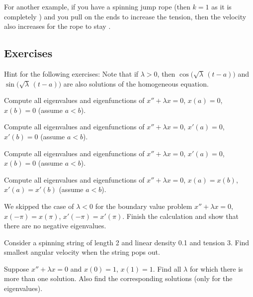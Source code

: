 For another example, if you have a spinning jump rope (then $k=1$ as it is
completely ) and you
pull on the ends to increase the tension, then the velocity also increases
for the rope to stay .


\subsection{Exercises}

Hint for the following exercises:  Note that
if $\lambda > 0$, then
$\cos \bigl( \sqrt{\lambda}\, (t - a) \bigr)$
and $\sin  \bigl( \sqrt{\lambda}\, (t - a) \bigr)$
are also solutions of the homogeneous
equation.

\begin{exercise}
Compute all
eigenvalues and eigenfunctions of
$x'' + \lambda x = 0$, $x(a) = 0$, $x(b) = 0$ (assume $a < b$).
\end{exercise}

\begin{exercise}
Compute all
eigenvalues and eigenfunctions of
$x'' + \lambda x = 0$, $x'(a) = 0$, $x'(b) = 0$ (assume $a < b$).
\end{exercise}

\begin{exercise}
Compute all
eigenvalues and eigenfunctions of
$x'' + \lambda x = 0$, $x'(a) = 0$, $x(b) = 0$ (assume $a < b$).
\end{exercise}

\begin{exercise}
Compute all 
eigenvalues and eigenfunctions of
$x'' + \lambda x = 0$, $x(a) = x(b)$, $x'(a) = x'(b)$ (assume $a < b$).
\end{exercise}

\begin{exercise}
We skipped the case of $\lambda < 0$ for
the boundary value problem
$x'' + \lambda x = 0$, $x(-\pi) = x(\pi)$, $x'(-\pi) = x'(\pi)$.
Finish the calculation and show that there are no negative eigenvalues.
\end{exercise}

\setcounter{exercise}{100}

\begin{exercise}
Consider a spinning string of length 2 and linear density 0.1 and tension 3.
Find smallest angular velocity when the string pops out.
\end{exercise}

\begin{exercise}
Suppose $x'' + \lambda x = 0$ and $x(0)=1$, $x(1) = 1$.
Find all $\lambda$ for which there is more
than one solution.  Also find the corresponding solutions (only for the
eigenvalues).
\end{exercise}

